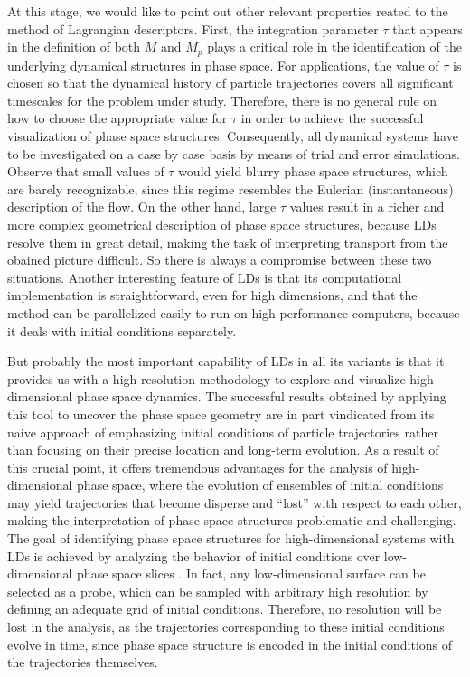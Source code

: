 \documentclass{ws-ijbc}
\begin{document}
At this stage, we would like to point out other relevant properties reated to the method of Lagrangian descriptors. First, the integration parameter $\tau$ that appears in the definition of both $M$ and $M_p$ plays a critical role in the identification of the underlying dynamical structures in phase space. For applications, the value of $\tau$ is chosen so that the dynamical history of particle trajectories covers all significant timescales for the problem under study. Therefore, there is no general rule on how to choose the appropriate value for $\tau$ in order to achieve the successful visualization of phase space structures. Consequently, all dynamical systems have to be investigated on a case by case basis by means of trial and error simulations. Observe that small values of $\tau$ would yield blurry phase space structures, which are barely recognizable, since this regime resembles the Eulerian (instantaneous) description of the flow. On the other hand, large $\tau$ values result in a richer and more complex geometrical description of phase space structures, because LDs resolve them in great detail, making the task of interpreting transport from the obained picture difficult. So there is always a compromise between these two situations. Another interesting feature of LDs is that its computational implementation is straightforward, even for high dimensions, and that the method can be parallelized easily to run on high performance computers, because it deals with initial conditions separately. 

But probably the most important capability of LDs in all its variants is that it provides us with a high-resolution methodology to explore and visualize high-dimensional phase space dynamics. The successful results obtained by applying this tool to uncover the phase space geometry are in part vindicated from its naive approach of emphasizing initial conditions of particle trajectories rather than focusing on their precise location and long-term evolution. As a result of this crucial point, it offers tremendous advantages for the analysis of high-dimensional phase space, where the evolution of ensembles of initial conditions may yield trajectories that become disperse and ``lost'' with respect to each other, making the interpretation of phase space structures problematic and challenging. The goal of identifying phase space structures for high-dimensional systems with LDs is achieved by analyzing the behavior of initial conditions over low-dimensional phase space slices \cite{demian2017,gg2018,Naik2019a,Naik2019b}. In fact, any low-dimensional surface can be selected as a probe, which can be sampled with arbitrary high resolution by defining an adequate grid of initial conditions. Therefore, no resolution will be lost in the analysis, as the trajectories corresponding to these initial conditions evolve in time, since phase space structure is encoded in the initial conditions of the trajectories themselves. 
\end{document}
